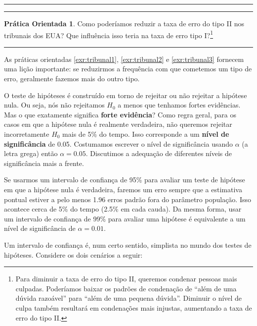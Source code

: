 \documentclass[
]{book}
\theoremstyle{definition}
\theoremstyle{definition}
\theoremstyle{definition}
\newtheorem{exercise}{Prática Orientada}[chapter]
\theoremstyle{definition}
\theoremstyle{remark}
\begin{document}
\begin{center}\rule{0.5\linewidth}{0.5pt}\end{center}

\begin{center}\rule{0.5\linewidth}{0.5pt}\end{center}

\begin{exercise}
\protect\hypertarget{exr:tribunal3}{}{\label{exr:tribunal3} } Como poderíamos reduzir a taxa de erro do tipo II nos tribunais dos EUA? Que influência isso teria na taxa de erro tipo I?\footnote{Para diminuir a taxa de erro do tipo II, queremos condenar pessoas mais culpadas. Poderíamos baixar os padrões de condenação de ``além de uma dúvida razoável'' para ``além de uma pequena dúvida''. Diminuir o nível de culpa também resultará em condenações mais injustas, aumentando a taxa de erro do tipo II.}
\end{exercise}

\begin{center}\rule{0.5\linewidth}{0.5pt}\end{center}

As práticas orientadas \ref{exr:tribunal1}, \ref{exr:tribunal2} e \ref{exr:tribunal3} fornecem uma lição importante: se reduzirmos a frequência com que cometemos um tipo de erro, geralmente fazemos mais do outro tipo.

O teste de hipóteses é construído em torno de rejeitar ou não rejeitar a hipótese nula. Ou seja, nós não rejeitamos \(H_0\) a menos que tenhamos fortes evidências. Mas o que exatamente significa \textbf{forte evidência}? Como regra geral, para os casos em que a hipótese nula é realmente verdadeira, não queremos rejeitar incorretamente \(H_0\) mais de 5\% do tempo. Isso corresponde a um \textbf{nível de significância} de 0.05. Costumamos escrever o nível de significância usando \(\alpha\) (a letra grega) então \(\alpha = 0.05\). Discutimos a adequação de diferentes níveis de significância mais a frente.

Se usarmos um intervalo de confiança de 95\% para avaliar um teste de hipótese em que a hipótese nula é verdadeira, faremos um erro sempre que a estimativa pontual estiver a pelo menos 1.96 erros padrão fora do parâmetro população. Isso acontece cerca de 5\% do tempo (2.5\% em cada cauda). Da mesma forma, usar um intervalo de confiança de 99\% para avaliar uma hipótese é equivalente a um nível de significância de \(\alpha = 0.01\).

Um intervalo de confiança é, num certo sentido, simplista no mundo dos testes de hipóteses. Considere os dois cenários a seguir:
\end{document}
